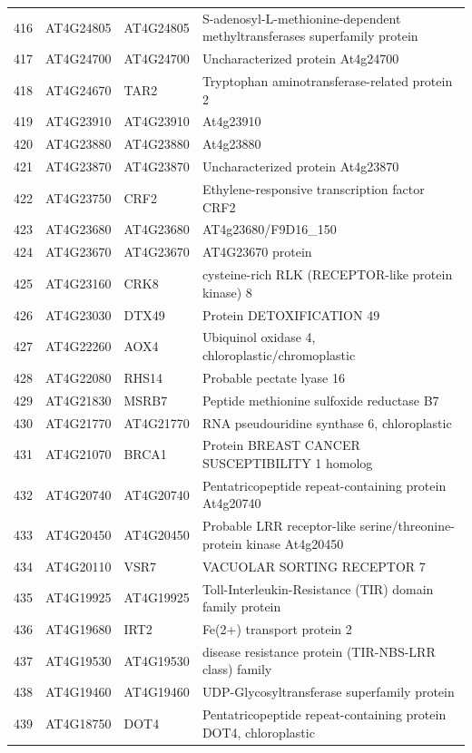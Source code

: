 \documentclass[11pt]{article}
\begin{document}
\begin{center}
\begin{tabular}{rlll}
416 & AT4G24805 & AT4G24805 & S-adenosyl-L-methionine-dependent methyltransferases superfamily protein\\
417 & AT4G24700 & AT4G24700 & Uncharacterized protein At4g24700\\
418 & AT4G24670 & TAR2 & Tryptophan aminotransferase-related protein 2\\
419 & AT4G23910 & AT4G23910 & At4g23910\\
420 & AT4G23880 & AT4G23880 & At4g23880\\
421 & AT4G23870 & AT4G23870 & Uncharacterized protein At4g23870\\
422 & AT4G23750 & CRF2 & Ethylene-responsive transcription factor CRF2\\
423 & AT4G23680 & AT4G23680 & AT4g23680/F9D16\_150\\
424 & AT4G23670 & AT4G23670 & AT4G23670 protein\\
425 & AT4G23160 & CRK8 & cysteine-rich RLK (RECEPTOR-like protein kinase) 8\\
426 & AT4G23030 & DTX49 & Protein DETOXIFICATION 49\\
427 & AT4G22260 & AOX4 & Ubiquinol oxidase 4, chloroplastic/chromoplastic\\
428 & AT4G22080 & RHS14 & Probable pectate lyase 16\\
429 & AT4G21830 & MSRB7 & Peptide methionine sulfoxide reductase B7\\
430 & AT4G21770 & AT4G21770 & RNA pseudouridine synthase 6, chloroplastic\\
431 & AT4G21070 & BRCA1 & Protein BREAST CANCER SUSCEPTIBILITY 1 homolog\\
432 & AT4G20740 & AT4G20740 & Pentatricopeptide repeat-containing protein At4g20740\\
433 & AT4G20450 & AT4G20450 & Probable LRR receptor-like serine/threonine-protein kinase At4g20450\\
434 & AT4G20110 & VSR7 & VACUOLAR SORTING RECEPTOR 7\\
435 & AT4G19925 & AT4G19925 & Toll-Interleukin-Resistance (TIR) domain family protein\\
436 & AT4G19680 & IRT2 & Fe(2+) transport protein 2\\
437 & AT4G19530 & AT4G19530 & disease resistance protein (TIR-NBS-LRR class) family\\
438 & AT4G19460 & AT4G19460 & UDP-Glycosyltransferase superfamily protein\\
439 & AT4G18750 & DOT4 & Pentatricopeptide repeat-containing protein DOT4, chloroplastic\\

\end{tabular}
\end{center}
\end{document}
